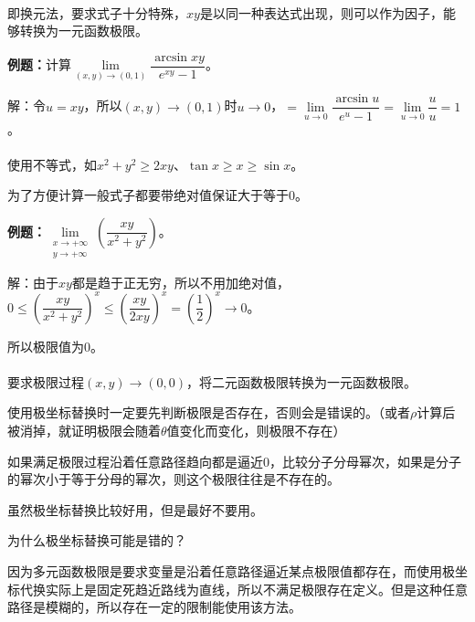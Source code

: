 \paragraph{}\leavevmode \medskip

即换元法，要求式子十分特殊，$xy$是以同一种表达式出现，则可以作为因子，能够转换为一元函数极限。

\textbf{例题：}计算$\lim\limits_{(x,y)\to(0,1)}\dfrac{\arcsin xy}{e^{xy}-1}$。

解：令$u=xy$，所以$(x,y)\to(0,1)$时$u\to0$，$=\lim\limits_{u\to0}\dfrac{\arcsin u}{e^u-1}=\lim\limits_{u\to0}\dfrac{u}{u}=1$。

\paragraph{}\leavevmode \medskip

使用不等式，如$x^2+y^2\geqslant2xy$、$\tan x\geqslant x\geqslant\sin x$。

为了方便计算一般式子都要带绝对值保证大于等于0。

\textbf{例题：}$\lim\limits_{\substack{x\to+\infty\\y\to+\infty}}\left(\dfrac{xy}{x^2+y^2}\right)$。

解：由于$xy$都是趋于正无穷，所以不用加绝对值，$0\leqslant\left(\dfrac{xy}{x^2+y^2}\right)^x\leqslant\left(\dfrac{xy}{2xy}\right)^x=\left(\dfrac{1}{2}\right)^x\to0$。

所以极限值为0。

\paragraph{}\leavevmode \medskip

要求极限过程$(x,y)\to(0,0)$，将二元函数极限转换为一元函数极限。

使用极坐标替换时一定要先判断极限是否存在，否则会是错误的。（或者$\rho$计算后被消掉，就证明极限会随着$\theta$值变化而变化，则极限不存在）

如果满足极限过程沿着任意路径趋向都是逼近0，比较分子分母幂次，如果是分子的幂次小于等于分母的幂次，则这个极限往往是不存在的。

虽然极坐标替换比较好用，但是最好不要用。

为什么极坐标替换可能是错的？

因为多元函数极限是要求变量是沿着任意路径逼近某点极限值都存在，而使用极坐标代换实际上是固定死趋近路线为直线，所以不满足极限存在定义。但是这种任意路径是模糊的，所以存在一定的限制能使用该方法。

